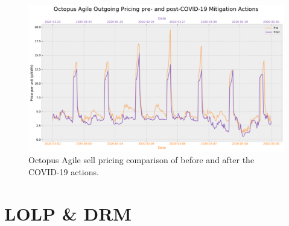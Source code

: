\documentclass[energies,article,submit,moreauthors,pdftex]{Definitions/mdpi}
\begin{document}
\begin{figure}[H]\centering
\hspace{-25pt}\includegraphics[width=15 cm]{Graphics/Pre-post_AgileOUTGO_comp.pdf}
\caption{Octopus Agile sell pricing comparison of before and after the COVID-19 actions.}\label{fig:agile_OUT_comp_prepost}
\end{figure}  
\section{LOLP \& DRM}
\end{document}
